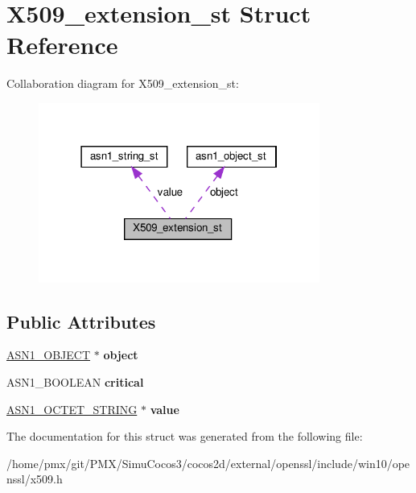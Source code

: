 \hypertarget{structX509__extension__st}{}\section{X509\+\_\+extension\+\_\+st Struct Reference}
\label{structX509__extension__st}


Collaboration diagram for X509\+\_\+extension\+\_\+st\+:
\nopagebreak
\begin{figure}[H]
\begin{center}
\leavevmode
\includegraphics[width=262pt]{structX509__extension__st__coll__graph}
\end{center}
\end{figure}
\subsection*{Public Attributes}
\begin{DoxyCompactItemize}
\item 
\mbox{\label{structX509__extension__st_a8aea7d682ad5be95235abe897c0160fa}} 
\hyperlink{structasn1__object__st}{A\+S\+N1\+\_\+\+O\+B\+J\+E\+CT} $\ast$ {\bfseries object}
\item 
\mbox{\label{structX509__extension__st_a143f7da8b44e344f89faf5ffc657031b}} 
A\+S\+N1\+\_\+\+B\+O\+O\+L\+E\+AN {\bfseries critical}
\item 
\mbox{\label{structX509__extension__st_a670220c7ca6eef25dde30f43db492114}} 
\hyperlink{structasn1__string__st}{A\+S\+N1\+\_\+\+O\+C\+T\+E\+T\+\_\+\+S\+T\+R\+I\+NG} $\ast$ {\bfseries value}
\end{DoxyCompactItemize}


The documentation for this struct was generated from the following file\+:\begin{DoxyCompactItemize}
\item 
/home/pmx/git/\+P\+M\+X/\+Simu\+Cocos3/cocos2d/external/openssl/include/win10/openssl/x509.\+h\end{DoxyCompactItemize}

